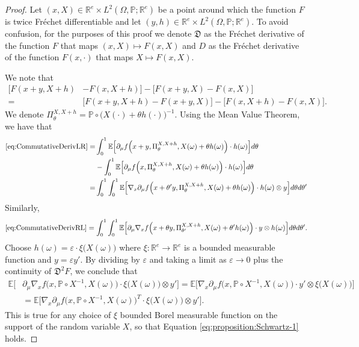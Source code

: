 \documentclass[a4paper,11pt,twoside]{article}
\numberwithin{equation}{section}
\theoremstyle{plain}
\newcommand{\bE}{\mathbb{E}}
\newcommand{\bP}{\mathbb{P}}
\newcommand{\bR}{\mathbb{R}}
\newcommand{\fD}{\mathfrak{D}}
\newcommand{\1}{\mathbbm{1}}
\begin{document}
	\begin{proof}
		Let $(x, X) \in \bR^e \times L^2(\Omega, \bP; \bR^e)$ be a point around which the function $F$ is twice Fr\'echet differentiable and let $(y, h) \in \bR^e \times L^2(\Omega, \bP; \bR^e)$. To avoid confusion, for the purposes of this proof we denote $\fD$ as the Fr\'echet derivative of the function $F$ that maps $(x, X) \mapsto F(x, X)$ and $D$ as the Fr\'echet derivative of the function $F(x, \cdot)$ that maps $X \mapsto F(x, X)$. 
		
		We note that 
		\begin{align}
			\label{eq:CommutativeDerivLR}
			\Big[ F(x+y, X+h)& - F(x, X+h) \Big] - \Big[ F(x+y, X) - F(x, X) \Big] 
			\\
			\label{eq:CommutativeDerivRL}
			=&\Big[ F(x+y, X+h) - F(x+y, X) \Big] - \Big[ F(x, X+h) - F(x, X) \Big]. 
		\end{align}
		We denote $\Pi_\theta^{X, X+h} = \bP \circ \big( X(\cdot) + \theta h(\cdot) \big)^{-1}$. 
		Using the Mean Value Theorem, we have that
		\begin{align*}
			\eqref{eq:CommutativeDerivLR} =&  \int_0^1 \bE\Big[ \partial_\mu f \Big( x+y, \Pi_{\theta}^{X, X+h}, X(\omega) + \theta h(\omega) \Big) \cdot h(\omega) \Big]  d\theta
			\\
			& - \int_0^1 \bE\Big[ \partial_\mu f\Big( x, \Pi_{\theta}^{X, X+h}, X(\omega)+\theta h(\omega) \Big) \cdot h(\omega) \Big]  d\theta 
			\\
			=& \int_0^1 \int_0^1 \bE \Big[ \nabla_x \partial_\mu f\Big( x+ \theta' y, \Pi_{\theta}^{X, X+h}, X(\omega)+\theta h(\omega) \Big) \cdot h(\omega) \otimes y \Big] d\theta d\theta'
		\end{align*}
		Similarly, 
		$$
		\eqref{eq:CommutativeDerivRL} = \int_0^1 \int_0^1 \bE \Big[ \partial_\mu \nabla_x  f\Big( x+ \theta y, \Pi_{\theta'}^{X, X+h}, X(\omega)+\theta' h(\omega) \Big) \cdot y \otimes h(\omega) \Big] d\theta d\theta'. 
		$$
		Choose $h(\omega) = \varepsilon \cdot \xi\big( X(\omega) \big)$ where $\xi:\bR^e \to \bR^e$ is a bounded measurable function and $y = \varepsilon y'$. By dividing by $\varepsilon$ and taking a limit as $\varepsilon \to 0$ plus the continuity of $\fD^2 F$, we conclude that
		\begin{align*}
			\bE \Big[& \partial_\mu \nabla_x f\Big( x, \bP\circ X^{-1}, X(\omega) \Big) \cdot \xi\big( X(\omega)\big) \otimes y' \Big] = \bE \Big[ \nabla_x \partial_\mu f\Big( x, \bP\circ X^{-1}, X(\omega) \Big) \cdot y' \otimes \xi\big( X(\omega) \big) \Big]
			\\
			&= \bE \Big[ \nabla_x \partial_\mu f\Big( x, \bP\circ X^{-1}, X(\omega) \Big)^T \cdot \xi\big( X(\omega) \big) \otimes y' \Big]. 
		\end{align*}
		This is true for any choice of $\xi$ bounded Borel measurable function on the support of the random variable $X$, so that Equation \eqref{eq:proposition:Schwartz-1} holds. 
	\end{proof}
	
\end{document}

